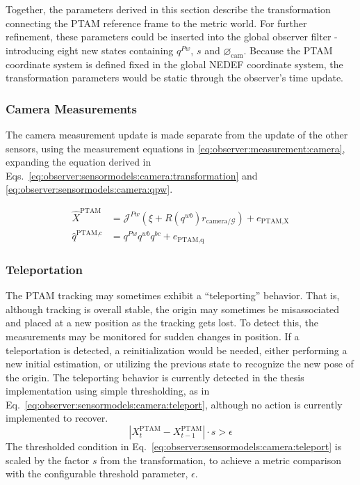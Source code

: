         Together, the parameters derived in this section describe the transformation
        connecting the PTAM reference frame to the metric world.
        For further refinement, these parameters could be inserted into the
        global observer filter - introducing eight new states containing
        $q^{Pw}$, $s$ and $\varnothing_{\text{cam}}$.
        Because the PTAM coordinate system is defined fixed in the global NEDEF coordinate system,
        the transformation parameters would be static through the observer's time update.

    \subsubsection{Camera Measurements}
        \label{sssec:observer:sensormodels:camera:refinement}
        The camera measurement update is made separate from the update of the other sensors, using
        the measurement equations in \eqref{eq:observer:measurement:camera}, expanding the
        equation derived in Eqs.~\eqref{eq:observer:sensormodels:camera:transformation} and \eqref{eq:observer:sensormodels:camera:qpw}.

        \begin{subequations}
            \label{eq:observer:measurement:camera}
            \begin{align}
                \hat{X}^{\text{PTAM}} &= \mathcal{J}^{Pw} (\xi + R(q^{wb})r_{\text{camera}/\mathcal{G}}) + e_{\text{PTAM,X}} \\
                \hat{q}^{\text{PTAM,c}} &= q^{Pw} q^{wb} q^{bc} + e_{\text{PTAM,q}}
            \end{align}
        \end{subequations}

    \subsubsection{Teleportation}
        \label{sssec:observer:sensormodels:camera:teleportation}
        The PTAM tracking may sometimes exhibit a ``teleporting'' behavior.
        That is, although tracking is overall stable, the origin may
        sometimes be misassociated and placed at a new position as the
        tracking gets lost.
        To detect this, the measurements may be monitored for sudden changes in position.
        If a teleportation is detected, a reinitialization would be needed,
        either performing a new initial estimation, or utilizing the previous state
        to recognize the new pose of the origin.
        The teleporting behavior is currently detected in the thesis implementation using simple thresholding,
        as in Eq.~\eqref{eq:observer:sensormodels:camera:teleport},
        although no action is currently implemented to recover.
        \begin{equation}
            \label{eq:observer:sensormodels:camera:teleport}
            \left|X^{\text{PTAM}}_{t} - X^{\text{PTAM}}_{t-1}\right| \cdot s > \epsilon
        \end{equation}
        The thresholded condition in Eq.~\eqref{eq:observer:sensormodels:camera:teleport}
        is scaled by the factor $s$ from the transformation, to achieve a metric comparison
        with the configurable threshold parameter, $\epsilon$.
